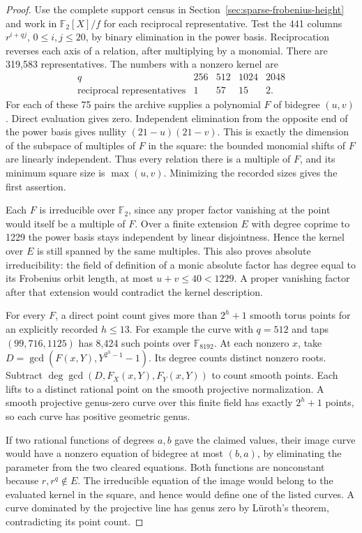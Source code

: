 \documentclass[11pt]{article}
\newcommand{\F}{\mathbb F_2}
\begin{document}
\begin{proof}
Use the complete support census in Section~\ref{sec:sparse-frobenius-height}
and work in \(\F[X]/f\) for each reciprocal representative.
Test the 441 columns \(r^{i+qj}\), \(0\le i,j\le20\), by binary
elimination in the power basis. Reciprocation reverses each axis of a
relation, after multiplying by a monomial. There are 319,583
representatives. The numbers with a nonzero kernel are
\[
\begin{array}{c|rrrr}
q &256&512&1024&2048\\\hline
\text{reciprocal representatives} &1&57&15&2 .
\end{array}
\]
For each of these 75 pairs the archive supplies a polynomial \(F\)
of bidegree \((u,v)\). Direct evaluation gives zero. Independent
elimination from the opposite end of the power basis gives nullity
\((21-u)(21-v)\). This is exactly the dimension of the subspace of
multiples of \(F\) in the square: the bounded monomial shifts of \(F\)
are linearly independent. Thus every relation there is a multiple of
\(F\), and its minimum square size is \(\max(u,v)\). Minimizing the
recorded sizes gives the first assertion.

Each \(F\) is irreducible over \(\F\), since any proper factor
vanishing at the point would itself be a multiple of \(F\).
Over a finite extension \(E\) with degree coprime to 1229 the power
basis stays independent by linear disjointness. Hence the kernel
over \(E\) is still spanned by the same multiples. This also proves
absolute irreducibility: the field of definition of a monic absolute
factor has degree equal to its Frobenius orbit length, at most
\(u+v\le40<1229\). A proper vanishing factor after that extension
would contradict the kernel description.

For every \(F\), a direct point count gives more than \(2^h+1\)
smooth torus points for an explicitly recorded \(h\le13\). For
example the curve with \(q=512\) and taps \((99,716,1125)\) has
8,424 such points over \(\mathbb F_{8192}\). At each nonzero \(x\),
take \(D=\gcd(F(x,Y),Y^{2^h-1}-1)\). Its degree counts distinct
nonzero roots. Subtract \(\deg\gcd(D,F_X(x,Y),F_Y(x,Y))\) to count
smooth points. Each lifts to a distinct rational point on the smooth
projective normalization. A smooth projective genus-zero curve over
this finite field has exactly \(2^h+1\) points, so each curve has
positive geometric genus.

If two rational functions of degrees \(a,b\) gave the claimed values,
their image curve would have a nonzero equation of bidegree at most
\((b,a)\), by eliminating the parameter from the two cleared
equations. Both functions are nonconstant because \(r,r^q\notin E\).
The irreducible equation of the image would belong to the evaluated
kernel in the square, and hence would define one of the listed curves.
A curve dominated by the projective line has genus zero by L\"uroth's
theorem, contradicting its point count.
\end{proof}
\end{document}

